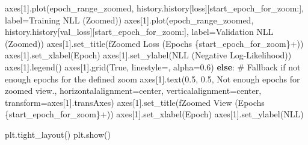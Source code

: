 \documentclass[
  letterpaper,
  DIV=11,
  numbers=noendperiod]{scrreprt}
\newenvironment{Shaded}{\begin{snugshade}}{\end{snugshade}}
\newcommand{\CommentTok}[1]{\textcolor[rgb]{0.37,0.37,0.37}{#1}}
\newcommand{\ControlFlowTok}[1]{\textcolor[rgb]{0.00,0.23,0.31}{\textbf{#1}}}
\newcommand{\DecValTok}[1]{\textcolor[rgb]{0.68,0.00,0.00}{#1}}
\newcommand{\FloatTok}[1]{\textcolor[rgb]{0.68,0.00,0.00}{#1}}
\newcommand{\NormalTok}[1]{\textcolor[rgb]{0.00,0.23,0.31}{#1}}
\newcommand{\OperatorTok}[1]{\textcolor[rgb]{0.37,0.37,0.37}{#1}}
\newcommand{\SpecialCharTok}[1]{\textcolor[rgb]{0.37,0.37,0.37}{#1}}
\newcommand{\SpecialStringTok}[1]{\textcolor[rgb]{0.13,0.47,0.30}{#1}}
\newcommand{\StringTok}[1]{\textcolor[rgb]{0.13,0.47,0.30}{#1}}
\newcommand{\VariableTok}[1]{\textcolor[rgb]{0.07,0.07,0.07}{#1}}
\begin{document}
\begin{Shaded}
\begin{Highlighting}[]
\NormalTok{    axes[}\DecValTok{1}\NormalTok{].plot(epoch\_range\_zoomed,}
\NormalTok{                 history.history[}\StringTok{\textquotesingle{}loss\textquotesingle{}}\NormalTok{][start\_epoch\_for\_zoom:],}
\NormalTok{                 label}\OperatorTok{=}\StringTok{\textquotesingle{}Training NLL (Zoomed)\textquotesingle{}}\NormalTok{)}
\NormalTok{    axes[}\DecValTok{1}\NormalTok{].plot(epoch\_range\_zoomed,}
\NormalTok{                 history.history[}\StringTok{\textquotesingle{}val\_loss\textquotesingle{}}\NormalTok{][start\_epoch\_for\_zoom:],}
\NormalTok{                 label}\OperatorTok{=}\StringTok{\textquotesingle{}Validation NLL (Zoomed)\textquotesingle{}}\NormalTok{)}
\NormalTok{    axes[}\DecValTok{1}\NormalTok{].set\_title(}\SpecialStringTok{f\textquotesingle{}Zoomed Loss (Epochs }\SpecialCharTok{\{}\NormalTok{start\_epoch\_for\_zoom}\SpecialCharTok{\}}\SpecialStringTok{+)\textquotesingle{}}\NormalTok{)}
\NormalTok{    axes[}\DecValTok{1}\NormalTok{].set\_xlabel(}\StringTok{\textquotesingle{}Epoch\textquotesingle{}}\NormalTok{)}
\NormalTok{    axes[}\DecValTok{1}\NormalTok{].set\_ylabel(}\StringTok{\textquotesingle{}NLL (Negative Log{-}Likelihood)\textquotesingle{}}\NormalTok{)}
\NormalTok{    axes[}\DecValTok{1}\NormalTok{].legend()}
\NormalTok{    axes[}\DecValTok{1}\NormalTok{].grid(}\VariableTok{True}\NormalTok{, linestyle}\OperatorTok{=}\StringTok{\textquotesingle{}{-}{-}\textquotesingle{}}\NormalTok{, alpha}\OperatorTok{=}\FloatTok{0.6}\NormalTok{)}
\ControlFlowTok{else}\NormalTok{:}
    \CommentTok{\# Fallback if not enough epochs for the defined zoom}
\NormalTok{    axes[}\DecValTok{1}\NormalTok{].text(}\FloatTok{0.5}\NormalTok{, }\FloatTok{0.5}\NormalTok{, }\StringTok{\textquotesingle{}Not enough epochs for zoomed view.\textquotesingle{}}\NormalTok{,}
\NormalTok{                 horizontalalignment}\OperatorTok{=}\StringTok{\textquotesingle{}center\textquotesingle{}}\NormalTok{, verticalalignment}\OperatorTok{=}\StringTok{\textquotesingle{}center\textquotesingle{}}\NormalTok{,}
\NormalTok{                 transform}\OperatorTok{=}\NormalTok{axes[}\DecValTok{1}\NormalTok{].transAxes)}
\NormalTok{    axes[}\DecValTok{1}\NormalTok{].set\_title(}\SpecialStringTok{f\textquotesingle{}Zoomed View (Epochs }\SpecialCharTok{\{}\NormalTok{start\_epoch\_for\_zoom}\SpecialCharTok{\}}\SpecialStringTok{+)\textquotesingle{}}\NormalTok{)}
\NormalTok{    axes[}\DecValTok{1}\NormalTok{].set\_xlabel(}\StringTok{\textquotesingle{}Epoch\textquotesingle{}}\NormalTok{)}
\NormalTok{    axes[}\DecValTok{1}\NormalTok{].set\_ylabel(}\StringTok{\textquotesingle{}NLL\textquotesingle{}}\NormalTok{)}


\NormalTok{plt.tight\_layout()}
\NormalTok{plt.show()}
\end{Highlighting}
\end{Shaded}
\end{document}
